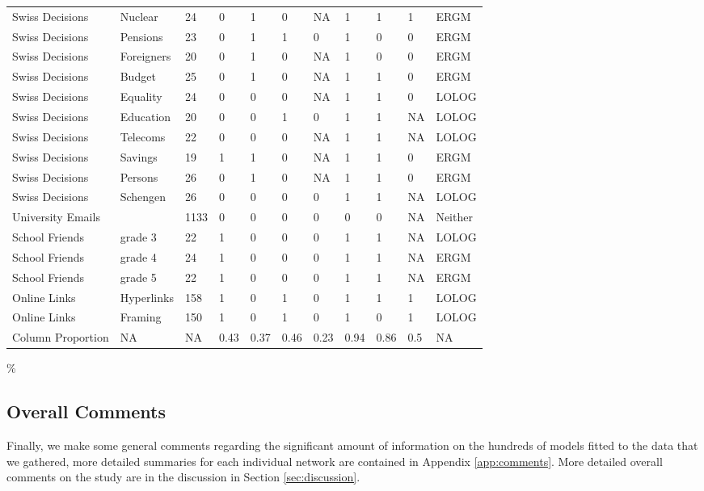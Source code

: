 \documentclass[
]{statsoc}
\begin{document}
\begin{longtable}[t]{lllllllllll}
\addlinespace
\rowcolor{gray!6}  Swiss Decisions & Nuclear & 24 & 0 & 1 & 0 & NA & 1 & 1 & 1 & ERGM\\
Swiss Decisions & Pensions & 23 & 0 & 1 & 1 & 0 & 1 & 0 & 0 & ERGM\\
\rowcolor{gray!6}  Swiss Decisions & Foreigners & 20 & 0 & 1 & 0 & NA & 1 & 0 & 0 & ERGM\\
Swiss Decisions & Budget & 25 & 0 & 1 & 0 & NA & 1 & 1 & 0 & ERGM\\
\rowcolor{gray!6}  Swiss Decisions & Equality & 24 & 0 & 0 & 0 & NA & 1 & 1 & 0 & LOLOG\\
\addlinespace
Swiss Decisions & Education & 20 & 0 & 0 & 1 & 0 & 1 & 1 & NA & LOLOG\\
\rowcolor{gray!6}  Swiss Decisions & Telecoms & 22 & 0 & 0 & 0 & NA & 1 & 1 & NA & LOLOG\\
Swiss Decisions & Savings & 19 & 1 & 1 & 0 & NA & 1 & 1 & 0 & ERGM\\
\rowcolor{gray!6}  Swiss Decisions & Persons & 26 & 0 & 1 & 0 & NA & 1 & 1 & 0 & ERGM\\
Swiss Decisions & Schengen & 26 & 0 & 0 & 0 & 0 & 1 & 1 & NA & LOLOG\\
\addlinespace
\rowcolor{gray!6}  University Emails &  & 1133 & 0 & 0 & 0 & 0 & 0 & 0 & NA & Neither\\
School Friends & grade 3 & 22 & 1 & 0 & 0 & 0 & 1 & 1 & NA & LOLOG\\
\rowcolor{gray!6}  School Friends & grade 4 & 24 & 1 & 0 & 0 & 0 & 1 & 1 & NA & ERGM\\
School Friends & grade 5 & 22 & 1 & 0 & 0 & 0 & 1 & 1 & NA & ERGM\\
\rowcolor{gray!6}  Online Links & Hyperlinks & 158 & 1 & 0 & 1 & 0 & 1 & 1 & 1 & LOLOG\\
\addlinespace
Online Links & Framing & 150 & 1 & 0 & 1 & 0 & 1 & 0 & 1 & LOLOG\\
\hline
\hline
\rowcolor{gray!6}  Column Proportion & NA & NA & 0.43 & 0.37 & 0.46 & 0.23 & 0.94 & 0.86 & 0.5 & NA\\
\bottomrule
\end{longtable}

\%

\subsection{Overall Comments}

Finally, we make some general comments regarding the significant amount
of information on the hundreds of models fitted to the data that we
gathered, more detailed summaries for each individual network are
contained in Appendix \ref{app:comments}. More detailed overall comments
on the study are in the discussion in Section \ref{sec:discussion}.
\end{document}
